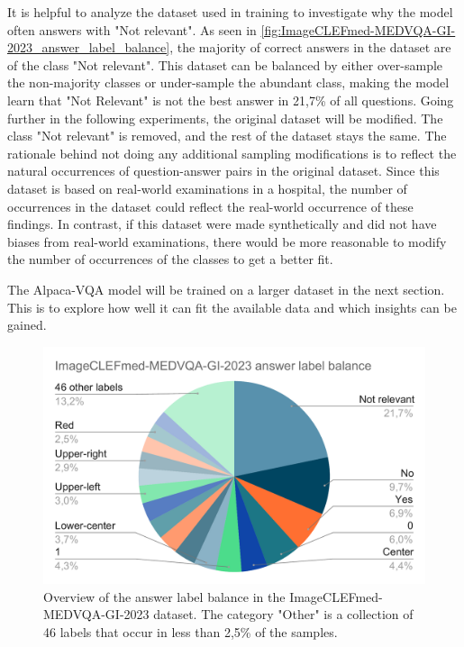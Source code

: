     It is helpful to analyze the dataset used in training to investigate why the model often answers with "Not relevant".
    As seen in \autoref{fig:ImageCLEFmed-MEDVQA-GI-2023_answer_label_balance}, the majority of correct answers in the dataset are of the class "Not relevant". This dataset can be balanced by either over-sample the non-majority classes or under-sample the abundant class, making the model learn that "Not Relevant" is not the best answer in 21,7\% of all questions.
    Going further in the following experiments, the original dataset will be modified. The class "Not relevant" is removed, and the rest of the dataset stays the same. The rationale behind not doing any additional sampling modifications is to reflect the natural occurrences of question-answer pairs in the original dataset. Since this dataset is based on real-world examinations in a hospital, the number of occurrences in the dataset could reflect the real-world occurrence of these findings. In contrast, if this dataset were made synthetically and did not have biases from real-world examinations, there would be more reasonable to modify the number of occurrences of the classes to get a better fit. 
    
    The Alpaca-VQA model will be trained on a larger dataset in the next section. 
    This is to explore how well it can fit the available data and which insights can be gained.


    \begin{figure}[htb]
        \centerline{
        \includegraphics[width=1.08\textwidth]{images/ImageCLEFmed-MEDVQA-GI-2023_answer_label_balance}}
        \caption[Overview of the answer label balance in the ImageCLEFmed-MEDVQA-GI-2023 dataset.]{Overview of the answer label balance in the ImageCLEFmed-MEDVQA-GI-2023 dataset. 
        The category "Other" is a collection of 46 labels that occur in less than 2,5\% of the samples.}
        \label{fig:ImageCLEFmed-MEDVQA-GI-2023_answer_label_balance}
    \end{figure} 


